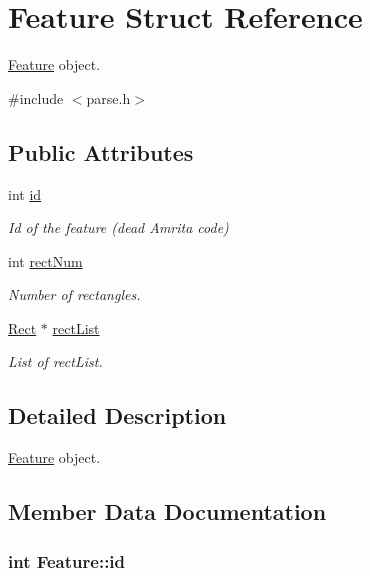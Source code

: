 \hypertarget{structFeature}{}\section{Feature Struct Reference}
\label{structFeature}


\hyperlink{structFeature}{Feature} object.  




{\ttfamily \#include $<$parse.\+h$>$}

\subsection*{Public Attributes}
\begin{DoxyCompactItemize}
\item 
int \hyperlink{structFeature_a69b7cfd8e31aa38378c9668108f8b827}{id}
\begin{DoxyCompactList}\small\item\em Id of the feature (dead Amrita code) \end{DoxyCompactList}\item 
int \hyperlink{structFeature_a7782b5439d41c7ba5cd5dbb83dad1285}{rect\+Num}
\begin{DoxyCompactList}\small\item\em Number of rectangles. \end{DoxyCompactList}\item 
\hyperlink{structRect}{Rect} $\ast$ \hyperlink{structFeature_a938970b1469dcb2555a05ef73d8639d2}{rect\+List}
\begin{DoxyCompactList}\small\item\em List of rect\+List. \end{DoxyCompactList}\end{DoxyCompactItemize}


\subsection{Detailed Description}
\hyperlink{structFeature}{Feature} object. 

\subsection{Member Data Documentation}
\hypertarget{structFeature_a69b7cfd8e31aa38378c9668108f8b827}{}
\subsubsection[{id}]{\setlength{\rightskip}{0pt plus 5cm}int Feature\+::id}\label{structFeature_a69b7cfd8e31aa38378c9668108f8b827}


